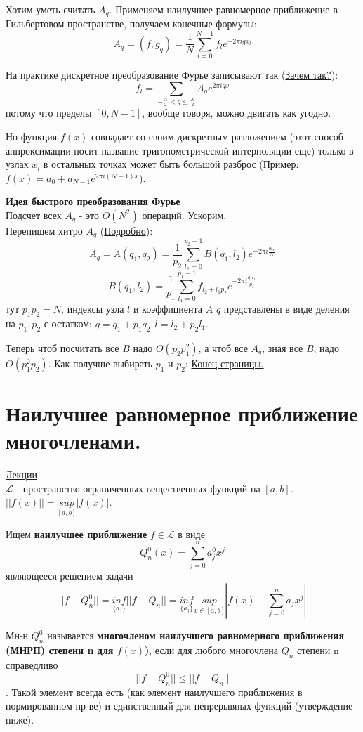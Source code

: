 \documentclass[specialist, subf, href, colorlinks=true, 12pt, times, mtpro, final]{disser}
\theoremstyle{definition}
\begin{document}
	Хотим уметь считать $A_q$. Применяем наилучшее равномерное приближение в Гильбертовом пространстве, получаем конечные формулы:
	$$
		A_q = (f, g_q) = \frac{1}{N}\sum\limits_{l = 0}^{N-1}f_le^{-2\pi i qx_l}
	$$
	
	На практике дискретное преобразование Фурье записывают так (\hyperlink {lects.33}{Зачем так?}):
	$$
		f_l = \sum\limits_{-\frac{N}{2} < q \le \frac{N}{2}} A_q e ^{2\pi i qx}
	$$
	потому что пределы $[0,N-1]$, вообще говоря, можно двигать как угодно.
	
	Но функция $f(x)$ совпадает со своим дискретным разложением (этот способ аппроксимации носит название тригонометрической интерполяции еще) только в узлах $x_l$ в остальных точках может быть большой разброс (\hyperlink {lects.33}{Пример:} $f(x) = a_0 + a_{N-1}e^{2\pi i (N-1)x}$).
	
	\textbf{Идея быстрого преобразования Фурье} \\
	Подсчет всех $A_q$ - это $O(N^2)$ операций. Ускорим.\\
	Перепишем хитро $A_q$ (\hyperlink {lects.34}{Подробно}):
	$$
		A_q = A(q_1, q_2) = \frac{1}{p_2}\sum\limits_{l_2 = 0}^{p_2 - 1} B(q_1, l_2)e^{-2\pi i \frac{ql_2}{N}}
	$$
	$$
		B(q_1, l_2) = \frac{1}{p_1}\sum\limits_{l_1 = 0}^{p_1 - 1}f_{l_2 + l_1p_2}e^{-2\pi i \frac{q_1l_1}{p_1}}
	$$
	тут $p_1p_2 = N$, индексы узла $l$ и коэффициента $A$ $q$ представлены в виде деления на $p_1, p_2$ с остатком: $q = q_1 + p_1q_2, l = l_2 + p_2l_1$.
	
	Теперь чтоб посчитать все $B$ надо $O(p_2p_1^2)$, а чтоб все $A_q$, зная все $B$, надо $O(p_1^2p_2)$. 
	Как получше выбирать $p_1$ и $p_2$: \hyperlink {lects.34}{Конец страницы.}

\section {Наилучшее равномерное приближение многочленами.}
	\hyperlink {lects.35}{Лекции}\\
	$\mathcal{L}$ - пространство ограниченных вещественных функций на $[a,b]$. $||f(x)|| = \underset{[a,b]}{sup}|f(x)|$.
	
	Ищем \textbf{наилучшее приближение} $f\in \mathcal{L}$ в виде
	$$
		Q_n^0 (x) = \sum\limits_{j=0}^{n}a_j^0x^j
	$$
	являющееся решением задачи
	$$
		||f - Q_n^0|| = \underset{\{a_j\}}{inf}||f-Q_n|| = \underset{\{a_j\}}{inf} \underset{x\in [a,b]}{sup} |f(x) - \sum\limits_{j=0}^{n} a_jx^j|
	$$
	
	Мн-н $Q_n^0$ называется \textbf{многочленом наилучшего равномерного приближения (МНРП) степени n для $f(x)$)}, если для любого многочлена $Q_n$ степени n справедливо $$||f-Q_n^0|| \le ||f-Q_n||$$. Такой элемент всегда есть (как элемент наилучшего приближения в нормированном пр-ве) и единственный для непрерывных функций (утверждение ниже).
	
\end{document}
